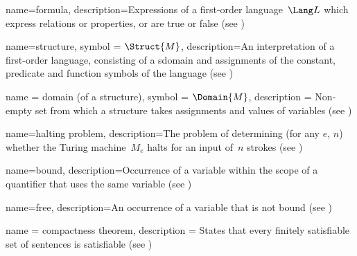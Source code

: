  {
  name={formula},  
  description={Expressions of a first-order language~$\Lang L$ which
    express relations or properties, or are true or false (see
    )} }

 {
  name={structure},
  symbol = {\ensuremath{\Struct{M}}},
  description={An interpretation of a first-order language, consisting
    of a \gls{sdomain} and assignments of the constant,
    predicate and function symbols of the language (see
    )} }

 {
  name = {domain (of a structure)},
  symbol = {\ensuremath{\Domain{M}}},
  description = {Non-empty set from which a \gls{structure} takes
    assignments and values of {variables} (see
    )} }
 
 {
  name=halting problem,
  description={The problem of determining (for any $e$, $n$) whether
    the Turing machine~$M_e$ halts for an input of~$n$ strokes (see
    )} }

 {
  name=bound,
  description={Occurrence of a variable
    within the scope of a quantifier that uses the same
    variable (see )}
}

 {
  name=free,
    description={An occurrence of a variable that is not \gls{bound}
    (see )}
}

 {
  name = {compactness theorem},  
  description = {States that every \gls{finitely satisfiable} set of
    sentences is satisfiable (see
    )}}






